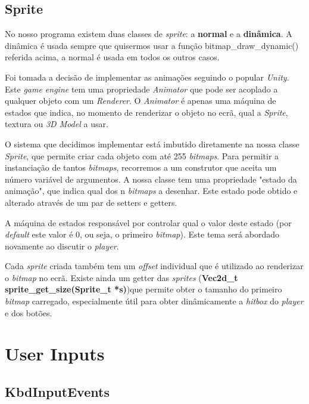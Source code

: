\documentclass{report}
\begin{document}
\subsection{Sprite}

No nosso programa existem duas classes de \textit{sprite}: a \textbf{normal} e a \textbf{dinâmica}. A dinâmica é usada sempre que quisermos usar a função bitmap\_draw\_dynamic() referida acima, a normal é usada em todos os outros casos.

Foi tomada a decisão de implementar as animações seguindo o popular \textit{Unity}. Este \textit{game engine} tem uma propriedade \textit{Animator} que pode ser acoplado a qualquer objeto com um \textit{Renderer}. O \textit{Animator} é apenas uma máquina de estados que indica, no momento de renderizar o objeto no ecrã, qual a \textit{Sprite}, textura ou \textit{3D Model} a usar.

O sistema que decidimos implementar está imbutido diretamente na nossa classe \textit{Sprite}, que permite criar cada objeto com até 255 \textit{bitmaps}. Para permitir a instanciação de tantos \textit{bitmaps}, recorremos a um construtor que aceita um número variável de argumentos. A nossa classe tem uma propriedade "estado da animação", que indica qual dos n \textit{bitmaps} a desenhar. Este estado pode obtido e alterado através de um par de setters e getters.

A máquina de estados responsável por controlar qual o valor deste estado (por \textit{default} este valor é 0, ou seja, o primeiro \textit{bitmap}). Este tema será abordado novamente ao discutir o \textit{player}.

Cada \textit{sprite} criada também tem um \textit{offset} individual que é utilizado ao renderizar o \textit{bitmap} no ecrã. Existe ainda um getter das \textit{sprites} (\textbf{Vec2d\_t sprite\_get\_size(Sprite\_t *s)})que permite obter o tamanho do primeiro \textit{bitmap} carregado, especialmente útil para obter dinâmicamente a \textit{hitbox} do \textit{player} e dos botões.\newline

\section{User Inputs}

\subsection{KbdInputEvents}
\end{document}
